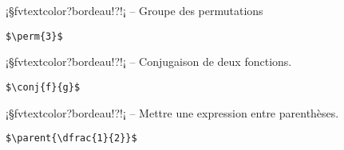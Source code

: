 \documentclass[11pt,a4paper,rgb]{report}
\begin{document}
\setlength{\leftskip}{0pt}
\setlength{\textwidth}{18cm}%


\vspace*{.75cm}

\inCodeStub¡§fvtextcolor?bordeau!?!¡ -- Groupe des permutations

\setlength{\leftskip}{.75cm}%
\setlength{\textwidth}{17.25cm}%

\colorbox{blue!15}{}
\hfill
\begin{minipage}{.65\textwidth}
	\begin{lstlisting}[linewidth=\textwidth, language={[LaTeX]TeX}]
	$\perm{3}$
	\end{lstlisting}
\end{minipage}

\setlength{\leftskip}{0pt}
\setlength{\textwidth}{18cm}%


\vspace*{.75cm}

\inCodeStub¡§fvtextcolor?bordeau!?!¡ -- Conjugaison de deux fonctions.

\setlength{\leftskip}{.75cm}%
\setlength{\textwidth}{17.25cm}%

\colorbox{blue!15}{}
\hfill
\begin{minipage}{.65\textwidth}
	\begin{lstlisting}[linewidth=\textwidth, language={[LaTeX]TeX}]
	$\conj{f}{g}$
	\end{lstlisting}
\end{minipage}

\setlength{\leftskip}{0pt}
\setlength{\textwidth}{18cm}%


\vspace*{.75cm}

\inCodeStub¡§fvtextcolor?bordeau!?!¡ -- Mettre une expression entre parenthèses.

\setlength{\leftskip}{.75cm}%
\setlength{\textwidth}{17.25cm}%

\colorbox{blue!15}{}
\hfill
\begin{minipage}{.65\textwidth}
	\begin{lstlisting}[linewidth=\textwidth, language={[LaTeX]TeX}]
	$\parent{\dfrac{1}{2}}$
	\end{lstlisting}
\end{minipage}
\end{document}
